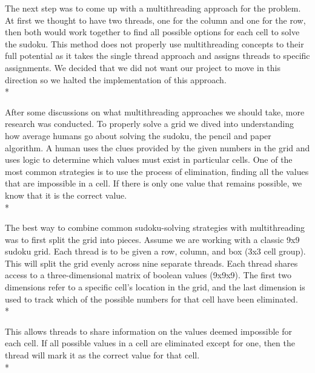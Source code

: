 \documentclass[conference]{IEEEtran}
\begin{document}
The next step was to come up with a multithreading approach for the problem. At first we thought to have two threads, one for the
column and one for the row, then both would work together to find all possible options for each cell to solve the sudoku.
This method does not properly use multithreading concepts to their full potential as it takes the single thread approach and assigns
threads to specific assignments. We decided that we did not want our project to move in this direction so we halted the
implementation of this approach.
\\*

After some discussions on what multithreading approaches we should take, more research was conducted.
To properly solve a grid we dived into understanding how average humans go about solving the sudoku, the pencil and paper algorithm.
A human uses the clues provided by the given numbers in the grid and uses logic to determine which values must
exist in particular cells. One of the most common strategies is to use the process of elimination, finding all the values that
are impossible in a cell. If there is only one value that remains possible, we know that it is the correct value.
\\*

The best way to combine common sudoku-solving strategies with multithreading was to first split the grid into pieces.
Assume we are working with a classic 9x9 sudoku grid. Each thread is to be given a row, column, and box (3x3 cell group).
This will split the grid evenly across nine separate threads. Each thread shares access to a three-dimensional matrix of boolean values
(9x9x9). The first two dimensions refer to a specific cell’s location in the grid, and the last dimension is used to track
which of the possible numbers for that cell have been eliminated.
\\*

This allows threads to share information on the values deemed impossible for each cell.
If all possible values in a cell are eliminated except for one, then the thread will mark it as the correct value for that cell.
\\*
\end{document}
